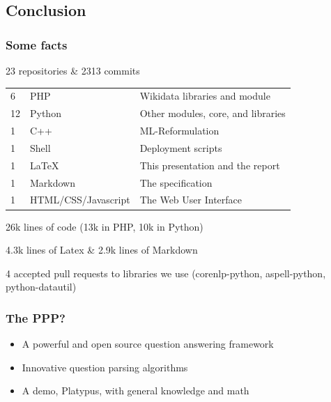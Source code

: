 \subsection{Conclusion}

\begin{frame}
    \frametitle{Some facts} %
    \alert{23 repositories \& 2313 commits}

    \begin{tabular}{lll}
        6 & PHP & Wikidata libraries and module\\
        12 & Python & Other modules, core, and libraries\\
        1 & C++ & ML-Reformulation\\
        1 & Shell & Deployment scripts\\
        1 & \LaTeX & This presentation and the report\\
        1 & Markdown & The specification\\
        1 & HTML/CSS/Javascript & The Web User Interface\\
    \end{tabular}

    \alert{26k lines} of code (13k in PHP, 10k in Python)

    \alert{4.3k lines} of Latex \& \alert{2.9k lines} of Markdown

    \alert{4} accepted pull requests to libraries we use (corenlp-python, aspell-python, python-datautil)
\end{frame}

\begin{frame}
    \frametitle{The PPP?}

    \begin{itemize}
        \item A powerful and open source question answering framework
        \item Innovative question parsing algorithms
        \item A demo, \alert{Platypus}, with general knowledge and math
    \end{itemize}
\end{frame}


